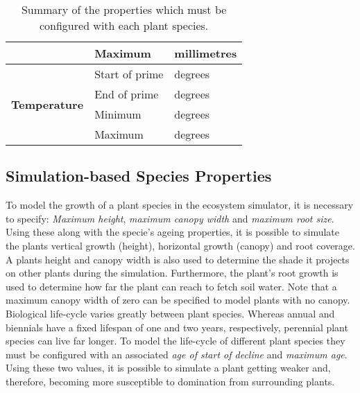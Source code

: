 \begin{table}[]
\begin{tabular}{|p{4cm}|p{7cm}|p{2cm}|}
								& \multicolumn{1}{l|}{Maximum} & \multicolumn{1}{l|}{millimetres} \\
		\hline    
		\multirow{4}{*}{\textbf{Temperature}}
								& \multicolumn{1}{l|}{Start of prime} & \multicolumn{1}{l|}{degrees} \\\cline{2-3}
								& \multicolumn{1}{l|}{End of prime} & \multicolumn{1}{l|}{degrees} \\\cline{2-3}
								& \multicolumn{1}{l|}{Minimum} & \multicolumn{1}{l|}{degrees} \\\cline{2-3}
								& \multicolumn{1}{l|}{Maximum} & \multicolumn{1}{l|}{degrees} \\
		\hline                                                                           
		\end{tabular}
	\label{tab:specie_properties}	
	\caption{Summary of the properties which must be configured with each plant species.}
\end{table}

\subsection{Simulation-based Species Properties}

To model the growth of a plant species in the ecosystem simulator, it is necessary to specify: \textit{Maximum height}, \textit{maximum canopy width} and \textit{maximum root size}. Using these along with the specie's ageing properties, it is possible to simulate the plants vertical growth (height), horizontal growth (canopy) and root coverage. A plants height and canopy width is also used to determine the shade it projects on other plants during the simulation. Furthermore, the plant's root growth is used to determine how far the plant can reach to fetch soil water. Note that a maximum canopy width of zero can be specified to model plants with no canopy.\\

Biological life-cycle varies greatly between plant species. Whereas annual and biennials have a fixed lifespan of one and two years, respectively, perennial plant species can live far longer. To model the life-cycle of different plant species they must be configured with an associated \textit{age of start of decline} and \textit{maximum age}. Using these two values, it is possible to simulate a plant getting weaker and, therefore, becoming more susceptible to domination from surrounding plants.\\

